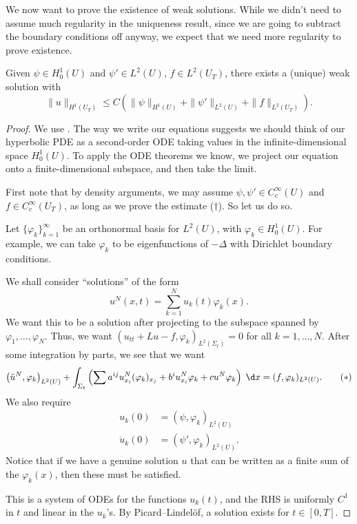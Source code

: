 \documentclass[a4paper]{article}
\begin{document}
We now want to prove the existence of weak solutions. While we didn't need to assume much regularity in the uniqueness result, since we are going to subtract the boundary conditions off anyway, we expect that we need more regularity to prove existence.
\begin{thm}
  Given $\psi \in H_0^1(U)$ and $\psi' \in L^2(U)$, $f \in L^2(U_T)$, there exists a (unique) weak solution with
  \[
    \|u\|_{H^1(U_T)} \leq C (\|\psi\|_{H^1(U)} + \|\psi'\|_{L^2(U)} + \|f\|_{L^2(U_T)}).\tag{$\dagger$}
  \]
\end{thm}
\begin{proof}
  We use . The way we write our equations suggests we should think of our hyperbolic PDE as a second-order ODE taking values in the infinite-dimensional space $H^1_0(U)$. To apply the ODE theorems we know, we project our equation onto a finite-dimensional subspace, and then take the limit.

  First note that by density arguments, we may assume $\psi, \psi' \in C_c^\infty(U)$ and $f \in C_c^\infty(U_T)$, as long as we prove the estimate ($\dagger$). So let us do so.

  Let $\{\varphi_k\}_{k = 1}^\infty$ be an orthonormal basis for $L^2(U)$, with $\varphi_k \in H_0^1(U)$. For example, we can take $\varphi_k$ to be eigenfunctions of $-\Delta$ with Dirichlet boundary conditions.

  We shall consider ``solutions'' of the form
  \[
    u^N(x, t) = \sum_{k = 1}^N u_k(t) \varphi_k(x).
  \]
  We want this to be a solution after projecting to the subspace spanned by $\varphi_1, \ldots, \varphi_N$. Thus, we want $(u_{tt} + Lu - f, \varphi_k)_{L^2(\Sigma_t)} = 0$ for all $k = 1,\ldots, N$. After some integration by parts, we see that we want
  \[
    \left(\ddot{u}^N, \varphi_k\right)_{L^2(U)} + \int_{\Sigma_t} \left(\sum a^{ij} u_{x_i}^N (\varphi_k)_{x_j} + b^i u_{x_i}^N \varphi_k + c u^N \varphi_k\right) \;\d x = (f, \varphi_k)_{L^2(U)}.\tag{$*$}
  \]
  We also require
  \begin{align*}
    u_k(0) &= (\psi, \varphi_k)_{L^2(U)}\\
    \dot{u}_k(0) &= (\psi', \varphi_k)_{L^2(U)}.
  \end{align*}
  Notice that if we have a genuine solution $u$ that can be written as a finite sum of the $\varphi_k(x)$, then these must be satisfied.

  This is a system of ODEs for the functions $u_k(t)$, and the RHS is uniformly $C^1$ in $t$ and linear in the $u_k$'s. By Picard--Lindel\"of, a solution exists for $t \in [0, T]$.


\end{proof}
\end{document}
